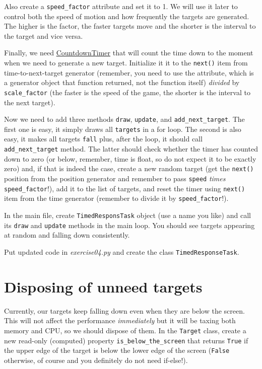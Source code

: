 \documentclass[
]{book}
\begin{document}
Also create a \texttt{speed\_factor} attribute and set it to 1. We will use it later to control both the speed of motion and how frequently the targets are generated. The higher is the factor, the faster targets move and the shorter is the interval to the target and vice versa.

Finally, we need \href{https://psychopy.org/api/clock.html\#psychopy.clock.CountdownTimer}{CountdownTimer} that will count the time down to the moment when we need to generate a new target. Initialize it it to the \texttt{next()} item from time-to-next-target generator (remember, you need to use the attribute, which is a generator object that function returned, not the function itself) \emph{divided} by \texttt{scale\_factor} (the faster is the speed of the game, the shorter is the interval to the next target).

Now we need to add three methods \texttt{draw}, \texttt{update}, and \texttt{add\_next\_target}. The first one is easy, it simply draws all \texttt{targets} in a for loop. The second is also easy, it makes all targets \texttt{fall} plus, after the loop, it should call \texttt{add\_next\_target} method. The latter should check whether the timer has counted down to zero (or below, remember, time is float, so do not expect it to be exactly zero) and, if that is indeed the case, create a new random target (get the \texttt{next()} position from the position generator and remember to pass \texttt{speed} \emph{times} \texttt{speed\_factor}!), add it to the list of targets, and reset the timer using \texttt{next()} item from the time generator (remember to divide it by \texttt{speed\_factor}!).

In the main file, create \texttt{TimedResponsTask} object (use a name you like) and call its \texttt{draw} and \texttt{update} methods in the main loop. You should see targets appearing at random and falling down consistently.

Put updated code in \emph{exercise04.py} and create the class \texttt{TimedResponseTask}.

\hypertarget{disposing-of-unneed-targets}{%
\section{Disposing of unneed targets}\label{disposing-of-unneed-targets}}

Currently, our targets keep falling down even when they are below the screen. This will not affect the performance \emph{immediately} but it will be taxing both memory and CPU, so we should dispose of them. In the \texttt{Target} class, create a new read-only (computed) property \texttt{is\_below\_the\_screen} that returns \texttt{True} if the upper edge of the target is below the lower edge of the screen (\texttt{False} otherwise, of course and you definitely do not need if-else!).
\end{document}
